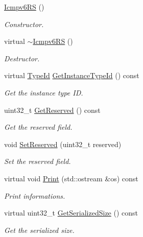 \begin{DoxyCompactItemize}
\item 
\hyperlink{classns3_1_1Icmpv6RS_afd75e638a4528a6e53112b063f746f3c}{Icmpv6\+RS} ()
\begin{DoxyCompactList}\small\item\em Constructor. \end{DoxyCompactList}\item 
virtual \hyperlink{classns3_1_1Icmpv6RS_aa9721b0308b6030b06eea9fd611aa159}{$\sim$\+Icmpv6\+RS} ()
\begin{DoxyCompactList}\small\item\em Destructor. \end{DoxyCompactList}\item 
virtual \hyperlink{classns3_1_1TypeId}{Type\+Id} \hyperlink{classns3_1_1Icmpv6RS_ac524f1dd16f8fc59ecbf383bf8d858a0}{Get\+Instance\+Type\+Id} () const 
\begin{DoxyCompactList}\small\item\em Get the instance type ID. \end{DoxyCompactList}\item 
uint32\+\_\+t \hyperlink{classns3_1_1Icmpv6RS_a7326107224c7e89ff605793f8e5e5814}{Get\+Reserved} () const 
\begin{DoxyCompactList}\small\item\em Get the reserved field. \end{DoxyCompactList}\item 
void \hyperlink{classns3_1_1Icmpv6RS_a043ab117e0cb1fd5e0c8060340e42047}{Set\+Reserved} (uint32\+\_\+t reserved)
\begin{DoxyCompactList}\small\item\em Set the reserved field. \end{DoxyCompactList}\item 
virtual void \hyperlink{classns3_1_1Icmpv6RS_a4831824227406f75ed665ac359093235}{Print} (std\+::ostream \&os) const 
\begin{DoxyCompactList}\small\item\em Print informations. \end{DoxyCompactList}\item 
virtual uint32\+\_\+t \hyperlink{classns3_1_1Icmpv6RS_add7bc6b2acedee0ed535b9d5d11fafda}{Get\+Serialized\+Size} () const 
\begin{DoxyCompactList}\small\item\em Get the serialized size. \end{DoxyCompactList}\item 

\end{DoxyCompactItemize}
